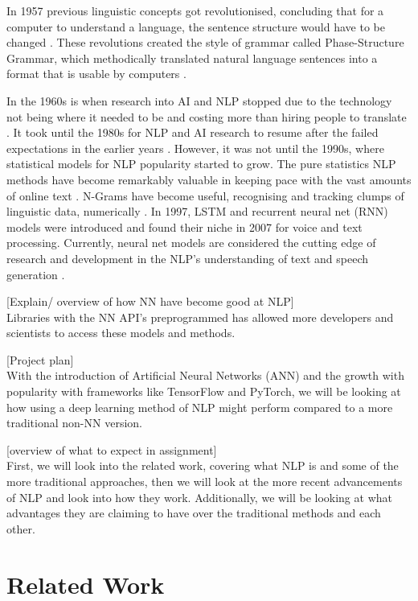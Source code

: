 \documentclass[a4paper,10pt]{article}
\begin{document}
	In 1957 previous linguistic concepts got revolutionised, concluding that for a computer to understand a language, the sentence structure would have to be changed \cite{chomsky2002syntactic}. These revolutions created the style of grammar called Phase-Structure Grammar, which methodically translated natural language sentences into a format that is usable by computers \cite{nlp_history}. 
	
	In the 1960s is when research into AI and NLP stopped due to the technology not being where it needed to be and costing more than hiring people to translate \cite{nlp_history}. It took until the 1980s for NLP and AI \cite{what_ai} research to resume after the failed expectations in the earlier years \cite{nlp_history}. However, it was not until the 1990s, where statistical models for NLP popularity started to grow. The pure statistics NLP methods have become remarkably valuable in keeping pace with the vast amounts of online text \cite{nlp_history}. N-Grams have become useful, recognising and tracking clumps of linguistic data, numerically \cite{n_grams}. In 1997, LSTM and recurrent neural net (RNN) models \cite{nlp_rnn} were introduced and found their niche in 2007 for voice and text processing. Currently, neural net models are considered the cutting edge of research and development in the NLP's understanding of text and speech generation \cite{nlp_history}.
	
	[Explain/ overview of how NN have become good at NLP]\\
	Libraries with the NN API's preprogrammed has allowed more developers and scientists to access these models and methods.
	
	[Project plan]\\ 
	With the introduction of Artificial Neural Networks (ANN) and the growth with popularity with frameworks like TensorFlow and PyTorch, we will be looking at how using a deep learning method of NLP might perform compared to a more traditional non-NN version.
	
	[overview of what to expect in assignment]\\
	First, we will look into the related work, covering what NLP is and some of the more traditional approaches, then we will look at the more recent advancements of NLP and look into how they work. Additionally, we will be looking at what advantages they are claiming to have over the traditional methods and each other.

\section{Related Work}
\label{sec:related_work}
\end{document}
